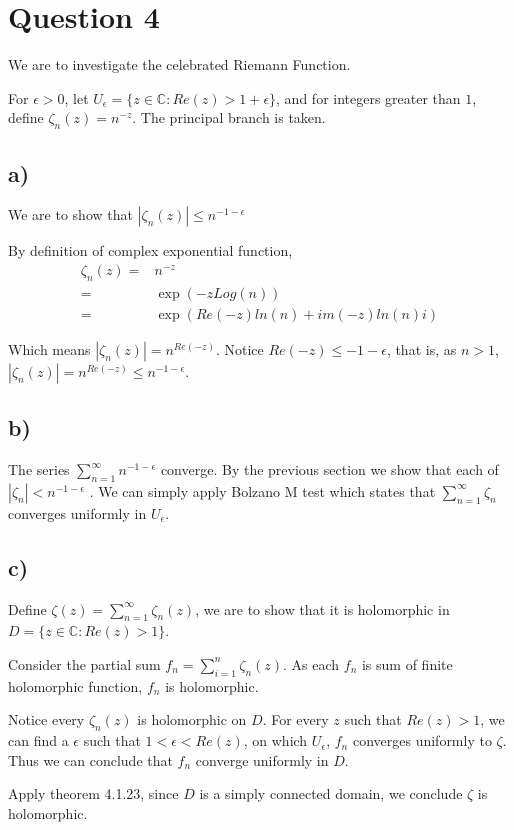 \documentclass[12pt, a4paper]{article}
\theoremstyle{definition}
\theoremstyle{remark}
\newcommand{\bb}[1]{\mathbb{#1}}
\begin{document}
\section{Question 4}

We are to investigate the celebrated Riemann Function.

For $\epsilon >0$, let $U_{\epsilon} = \{z \in \bb{C}: Re(z) > 1+ \epsilon\}$, and for integers greater than $1$, define $\zeta_n (z) = n^{-z}$. The principal branch is taken.

\subsection{a)}

We are to show that $|\zeta_n (z)| \leq n^{-1-\epsilon}$

By definition of complex exponential function,
\begin{align}
	\zeta_n (z) 
	=& n^{-z}  \\
	=& \exp{(-z Log(n))} \\
	=& \exp{(Re(-z)ln(n) + im(-z) ln(n)i)}
\end{align}

Which means $|\zeta_n (z)| = n^{Re(-z)}$. 
Notice $Re(-z) \leq -1 - \epsilon$, that is, as $n>1$, $|\zeta_n(z)| = n^{Re(-z)} \leq n^{-1-\epsilon}$.

\subsection{b)}

The series $\sum_{n=1}^{\infty} n^{-1-\epsilon}$ converge. By the previous section we show that each of $|\zeta_n| < n^{-1-\epsilon}$ .
We can simply apply Bolzano M test which states that $\sum_{n=1}^{\infty} \zeta_n$ converges uniformly in $U_{\epsilon}$.

\subsection{c)}

Define $\zeta(z) = \sum_{n=1}^{\infty} \zeta_n(z)$, we are to show that it is holomorphic in $D = \{z \in \bb{C}: Re(z) > 1\}$.

Consider the partial sum $f_n = \sum_{i=1}^{n} \zeta_n(z)$.
As each $f_n$ is sum of finite holomorphic function, $f_n$ is holomorphic. 

Notice every $\zeta_n(z)$ is holomorphic on $D$. For every $z$ such that $Re(z) > 1$, we can find a $\epsilon$ such that $1<\epsilon<Re(z)$, on which $U_{\epsilon}$, $f_n$ converges uniformly to $\zeta$. 
Thus we can conclude that $f_n$ converge uniformly in $D$.

Apply theorem 4.1.23, since $D$ is a simply connected domain, we conclude $\zeta$ is holomorphic.
\end{document}
